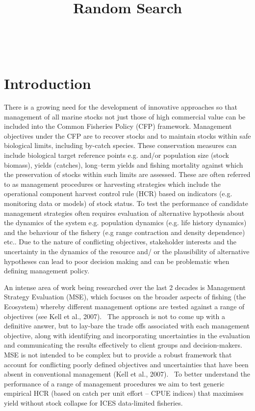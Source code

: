 \documentclass[11pt]{article}
\title{\textbf{Random Search}}
\author{}
\begin{document}
\maketitle

\tableofcontents
\newpage\clearpage


\tableofcontents\newpage\

\section{Introduction}
There is a growing need for the development of innovative approaches so that management of all marine stocks not just those of high commercial value can be included into the Common Fisheries Policy (CFP) framework. Management objectives under the CFP are to recover stocks and to maintain stocks within safe biological limits, including by-catch species. These conservation measures can include biological target reference points e.g. and/or population size (stock biomass), yields (catches), long–term yields and fishing mortality against which the preservation of stocks within such limits are assessed. These are often referred to as management procedures or harvesting strategies which include the operational component harvest control rule (HCR) based on indicators (e.g. monitoring data or models) of stock status. To test the performance of candidate management strategies often requires evaluation of alternative hypothesis about the dynamics of the system e.g. population dynamics (e.g. life history dynamics) and the behaviour of the fishery (e.g range contraction and density dependence) etc..  Due to the nature of conflicting objectives, stakeholder interests and the uncertainty in the dynamics of the resource and/ or the plausibility of alternative hypotheses can lead to poor decision making and can be problematic when defining management policy.

An intense area of work being researched over the last 2 decades is Management Strategy Evaluation (MSE), which focuses on the broader aspects of fishing (the Ecosystem) whereby different management options are tested against a range of objectives (see Kell et al., 2007).  The approach is not to come up with a definitive answer, but to lay-bare the trade offs associated with each management objective, along with identifying and incorporating uncertainties in the evaluation and communicating the results effectively to client groups and decision-makers. MSE is not intended to be complex but to provide a robust framework that account for conflicting poorly defined objectives and uncertainties that have been absent in conventional management (Kell et al., 2007).  
To better understand the performance of a range of management procedures we aim to test generic empirical HCR (based on catch per unit effort – CPUE indices) that maximises yield without stock collapse for ICES data-limited fisheries. 
\end{document}
